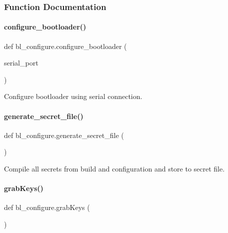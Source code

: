 \subsubsection{Function Documentation}
\mbox{\label{namespacebl__configure_a13b2e4d272f346de76550bfeb68e58fd}} 
\paragraph{\texorpdfstring{configure\+\_\+bootloader()}{configure\_bootloader()}}
{\footnotesize\ttfamily def bl\+\_\+configure.\+configure\+\_\+bootloader (\begin{DoxyParamCaption}\item[{}]{serial\+\_\+port }\end{DoxyParamCaption})}

\begin{DoxyVerb}Configure bootloader using serial connection.
\end{DoxyVerb}
 \mbox{\label{namespacebl__configure_aa03bcc90dd45cdf168040dd97474dd3f}} 
\paragraph{\texorpdfstring{generate\+\_\+secret\+\_\+file()}{generate\_secret\_file()}}
{\footnotesize\ttfamily def bl\+\_\+configure.\+generate\+\_\+secret\+\_\+file (\begin{DoxyParamCaption}{ }\end{DoxyParamCaption})}

\begin{DoxyVerb}Compile all secrets from build and configuration and store to secret file.
\end{DoxyVerb}
 \mbox{\label{namespacebl__configure_a36908b22c0bc31acc390af22d287e739}} 
\paragraph{\texorpdfstring{grab\+Keys()}{grabKeys()}}
{\footnotesize\ttfamily def bl\+\_\+configure.\+grab\+Keys (\begin{DoxyParamCaption}{ }\end{DoxyParamCaption})}



